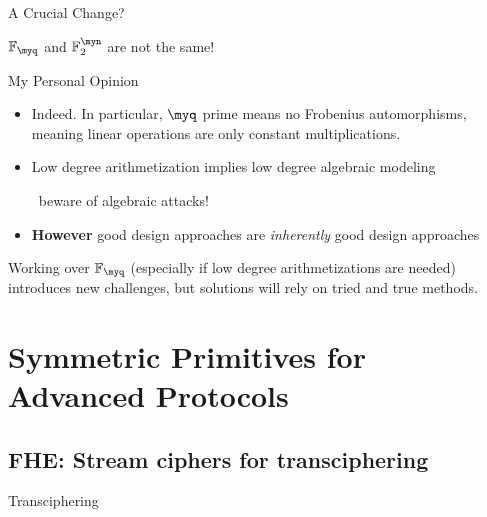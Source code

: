 \documentclass[presentation,aspectratio=1610]{beamer}
\begin{document}
\begin{frame}{A Crucial Change?}
  \begin{center}
    {\large $\F_\myq$ and $\F_2^\myn$ are not the same!}
  \end{center}

  \pause

  \begin{exampleblock}{My Personal Opinion}
    \begin{itemize}
      \setlength\itemsep{0.3cm}
    \item Indeed. \pause In particular, $\myq$ prime means no Frobenius automorphisms, meaning linear operations are only \alert{constant multiplications}.
      \pause
    \item Low degree arithmetization implies low degree algebraic modeling

      ~\hfill \alert{beware of algebraic attacks!}
      \pause
    \item \textbf{However} good design approaches are \emph{inherently} good design approaches
    \end{itemize}

    \pause

    \begin{center}
      Working over $\mathbb{F}_\myq$ (especially if low degree arithmetizations are needed) introduces new challenges, \alert{but solutions will rely on tried and true methods}.
    \end{center}
  \end{exampleblock}
\end{frame}


\section{Symmetric Primitives for Advanced Protocols}

\subsection{FHE: Stream ciphers for transciphering}



\begin{frame}{Transciphering}
\end{frame}
\end{document}
